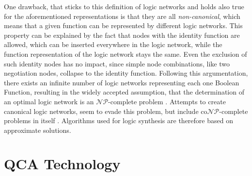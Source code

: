 One drawback, that sticks to this definition of logic networks and holds also true for the aforementioned representations is that they are all \textit{non-canonical}, which means that a given function can be represented by different logic networks. This property can be explained by the fact that nodes with the identity function are allowed, which can be inserted everywhere in the logic network, while the function representation of the logic network stays the same. Even the exclusion of such identity nodes has no impact, since simple node combinations, like two negotiation nodes, collapse to the identity function. Following this argumentation, there exists an infinite number of logic networks representing each one Boolean Function, resulting in the widely accepted assumption, that the determination of an optimal logic network is an $\mathcal{NP}$-complete problem \cite{Walter}. Attempts to create canonical logic networks, seem to evade this problem, but include co$\mathcal{NP}$-complete problems in itself \cite{LogicNetwork}. Algorithms used for logic synthesis are therefore based on approximate solutions.


\section{QCA Technology}

